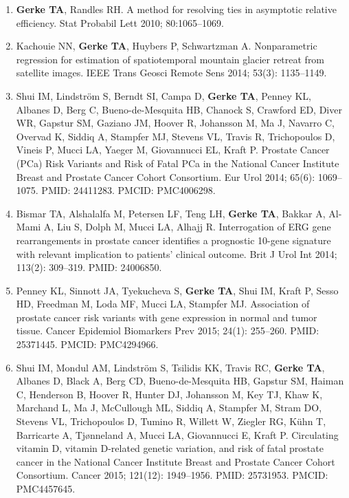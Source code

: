 \documentclass[11pt, a4paper]{article} %
\begin{document}
\begin{enumerate}[leftmargin=*]
\item{} {\bf Gerke TA}, Randles RH. A method for resolving ties in asymptotic relative efficiency.
Stat Probabil Lett 2010; 80:1065--1069.

\item{} Kachouie NN, {\bf Gerke TA}, Huybers P, Schwartzman A. Nonparametric regression for estimation of spatiotemporal mountain glacier retreat from satellite images. IEEE Trans Geosci Remote Sens 2014; 53(3): 1135--1149.

\item{} Shui IM, Lindstr\"{o}m S, Berndt SI, Campa D, {\bf Gerke TA}, Penney KL, Albanes D, Berg C, Bueno-de-Mesquita HB, Chanock S, Crawford ED, Diver WR, Gapstur SM, Gaziano JM, Hoover R, Johansson M, Ma J, Navarro C, Overvad K, Siddiq A, Stampfer MJ, Stevens VL, Travis R, Trichopoulos D, Vineis P, Mucci LA, Yaeger M, Giovannucci EL, Kraft P. Prostate Cancer (PCa) Risk Variants and Risk of Fatal PCa in the National Cancer Institute Breast and Prostate Cancer Cohort Consortium. Eur Urol 2014; 65(6): 1069--1075. PMID: 24411283. PMCID: PMC4006298.

\item{} Bismar TA, Alshalalfa M, Petersen LF, Teng LH, {\bf Gerke TA}, Bakkar A, Al-Mami A, Liu S, Dolph M, Mucci LA, Alhajj R. Interrogation of ERG gene rearrangements in prostate cancer identifies a prognostic 10-gene signature with relevant implication to patients' clinical outcome. Brit J Urol Int 2014; 113(2): 309--319. PMID: 24006850.

\item{} Penney KL, Sinnott JA, Tyekucheva S, {\bf Gerke TA}, Shui IM, Kraft P, Sesso HD, Freedman M, Loda MF, Mucci LA, Stampfer MJ. Association of prostate cancer risk variants with gene expression in normal and tumor tissue. Cancer Epidemiol Biomarkers Prev 2015; 24(1): 255--260. PMID: 25371445. PMCID: PMC4294966.

\item{} Shui IM, Mondul AM, Lindstr\"{o}m S, Tsilidis KK, Travis RC, {\bf Gerke TA}, Albanes D, Black A, Berg CD, Bueno-de-Mesquita HB, Gapstur SM, Haiman C, Henderson B, Hoover R, Hunter DJ, Johansson M, Key TJ, Khaw K, Marchand L, Ma J, McCullough ML, Siddiq A, Stampfer M, Stram DO, Stevens VL, Trichopoulos D, Tumino R, Willett W, Ziegler RG, K\"{u}hn T, Barricarte A, Tj\o nneland A, Mucci LA, Giovannucci E, Kraft P. Circulating vitamin D, vitamin D-related genetic variation, and risk of fatal prostate cancer in the National Cancer Institute Breast and Prostate Cancer Cohort Consortium. Cancer 2015; 121(12): 1949--1956. PMID: 25731953. PMCID: PMC4457645.


\end{enumerate}
\end{document}
